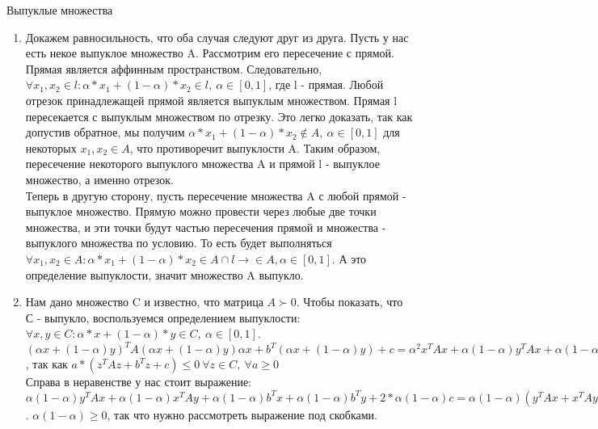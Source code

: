 \documentclass[12pt]{extreport}
\theoremstyle{definiton}
\theoremstyle{definition}
\theoremstyle{definition}
\let\leq\leqslant
\let\geq\geqslant
\begin{document}
	\PR[] Выпуклые множества
    
    \begin{enumerate} 
        \item Докажем равносильность, что оба случая следуют друг из друга. Пусть у нас есть некое выпуклое множество A. Рассмотрим его пересечение с прямой. Прямая является аффинным пространством. Следовательно, $\forall x_1, x_2 \in l: \alpha*x_1 + (1-\alpha)*x_2 \in l,\ \alpha \in [0,1]$, где l - прямая. Любой отрезок принадлежащей прямой является выпуклым множеством. Прямая l пересекается с выпуклым множеством по отрезку. Это легко доказать, так как допустив обратное, мы получим $\alpha*x_1 + (1-\alpha)*x_2 \notin A,\ \alpha \in [0,1]$ для некоторых $x_1, x_2 \in A$, что противоречит выпуклости A. Таким образом, пересечение некоторого выпуклого множества A и прямой l - выпуклое множество, а именно отрезок.
        \newline
        \\Теперь в другую сторону, пусть пересечение множества A с любой прямой - выпуклое множество. Прямую можно провести через любые две точки множества, и эти точки будут частью пересечения прямой и множества - выпуклого множества по условию. То есть будет выполняться $\forall x_1, x_2 \in A: \alpha*x_1 + (1-\alpha)*x_2 \in A \cap l \to \in A, \alpha \in [0,1]$. А это определение выпуклости, значит множество A выпукло.
        \item  Нам дано множество C и известно, что матрица $A\succ0$. Чтобы показать, что С - выпукло, воспользуемся определением выпуклости: $\forall x, y \in C: \alpha*x + (1-\alpha)*y \in C,\ \alpha \in [0,1]$. 
        \\ $(\alpha x + (1-\alpha)y)^TA(\alpha x + (1-\alpha)y)\alpha x + b^T(\alpha x + (1-\alpha)y) + c = \alpha^2x^TAx + \alpha(1-\alpha)y^TAx + \alpha(1-\alpha)x^TAy + (1-\alpha)^2y^TAy + \alpha b^Tx+(1-\alpha)b^Ty+c = \alpha^2x^TAx + \alpha(1-\alpha)y^TAx + \alpha(1-\alpha)x^TAy + (1-\alpha)^2y^TAy+\alpha^2b^Tx+\alpha(1-\alpha)b^Tx+(1-\alpha)^2b^Ty+\alpha(1-\alpha)b^Ty+\alpha^2c+2*\alpha(1-\alpha)c + (1-\alpha)^2c \leq \alpha(1-\alpha)y^TAx + \alpha(1-\alpha)x^TAy + \alpha(1-\alpha)b^Tx + \alpha(1-\alpha)b^Ty + 2*\alpha(1-\alpha)c$, так как $a*(z^TAz +b^Tz+c) \leq 0\ \forall z \in C,\ \forall a \geq 0$
        \newline
        \\ Справа в неравенстве у нас стоит выражение: $\alpha(1-\alpha)y^TAx + \alpha(1-\alpha)x^TAy + \alpha(1-\alpha)b^Tx + \alpha(1-\alpha)b^Ty + 2*\alpha(1-\alpha)c = \alpha(1-\alpha)(y^TAx+x^TAy+b^Tx+b^Ty+2*c)$. $\alpha(1-\alpha) \geq 0$, так что нужно рассмотреть выражение под скобками.

\end{enumerate}
\end{document}

